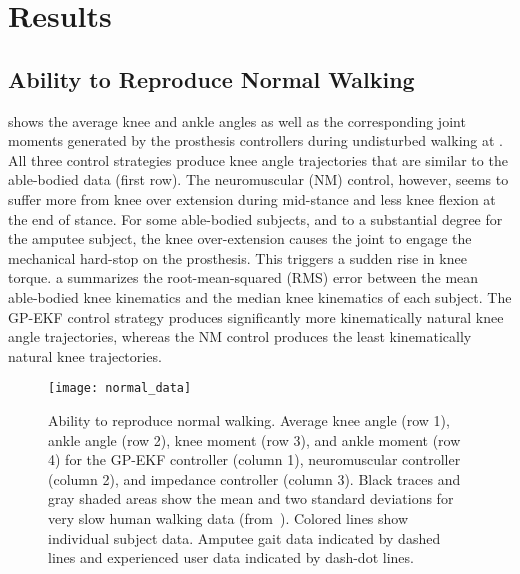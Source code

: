 \section{Results}\label{sec:results}
\subsection{Ability to Reproduce Normal Walking}

 shows the average knee and ankle angles as well
as the corresponding joint moments generated by the prosthesis controllers
during undisturbed walking at . All three control strategies
produce knee angle trajectories that are similar to the able-bodied data (first
row). The neuromuscular (NM) control, however, seems to suffer more from knee
over extension during mid-stance and less knee flexion at the end of stance. For
some able-bodied subjects, and to a substantial degree for the amputee subject,
the knee over-extension causes the joint to engage the mechanical hard-stop on
the prosthesis. This triggers a sudden rise in knee torque.
a summarizes the root-mean-squared (RMS) error
between the mean able-bodied knee kinematics and the median knee kinematics of
each subject. The GP-EKF control strategy produces significantly more
kinematically natural knee angle trajectories, whereas the NM control produces
the least kinematically natural knee trajectories. 
\begin{figure*}[t]
    \centering
    \texttt{[image: normal\_data]} 
    \caption{Ability to reproduce normal walking. Average knee angle (row 1),
    ankle angle (row 2), knee moment (row 3), and ankle moment (row 4) for the
    GP-EKF controller (column 1), neuromuscular controller (column 2), and
    impedance controller (column 3). Black traces and gray shaded areas show the
    mean and two standard deviations for very slow human walking data
    (from~\citep{bovi2011multiple}). Colored lines show individual subject data.
    Amputee gait data indicated by dashed lines and experienced user data
    indicated by dash-dot lines.}\label{fig:controller_comparison}
\end{figure*}

